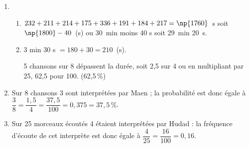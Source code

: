 \begin{enumerate}
\item 
	\begin{enumerate}
		\item %
$232+211+214+175+336+191+184+217 = \np{1760}$~s soit $\np{1800} - 40$~(s) ou 30~min moins 40 s  soit 29~min 20~s.		 
		\item %
3 min 30 s $= 180 + 30 = 210$~(s).

5 chansons sur 8 dépassent la durée, soit 2,5 sur 4 ou en multipliant par 25, 62,5 pour 100.\: (62,5\,\%) 
	\end{enumerate}
\item %

Sur 8 chansons 3 sont interprétées par Maen ; la probabilité est donc égale à $\dfrac{3}{8} = \dfrac{1,5}{4} = \dfrac{37,5}{100} = 0,375 = 37,5\,\%$. 
\item %

%
Sur 25 morceaux écoutés 4 étaient interprétées par Hudad : la fréquence d'écoute de cet interprète est donc égale à $\dfrac{4}{25} = \dfrac{16}{100} = 0,16$.
\end{enumerate}

\vspace{0.5cm}

